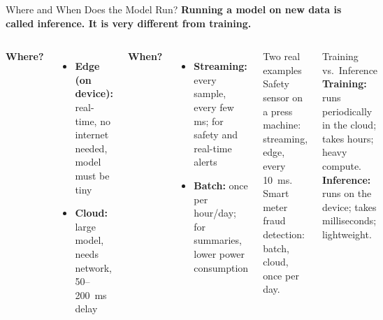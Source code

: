 \documentclass[aspectratio=169,11pt]{beamer}
\begin{document}
\begin{frame}{Where and When Does the Model Run?}
    \small
    \textbf{Running a model on new data is called \textbf{inference}. It is very different from training.}

    \vspace{0.25cm}
    \begin{columns}
        \textbf{Where?}
        \begin{itemize}\setlength{\itemsep}{8pt}
            \item \textbf{Edge (on device):} real-time, no internet needed, model must be tiny
            \item \textbf{Cloud:} large model, needs network, 50--200~ms delay
        \end{itemize}

        \vspace{0.3cm}
        \textbf{When?}
        \begin{itemize}\setlength{\itemsep}{8pt}
            \item \textbf{Streaming:} every sample, every few ms; for safety and real-time alerts
            \item \textbf{Batch:} once per hour/day; for summaries, lower power consumption
        \end{itemize}

        \begin{exampleblock}{Two real examples}
            Safety sensor on a press machine: streaming, edge, every 10~ms.\\[6pt]
            Smart meter fraud detection: batch, cloud, once per day.
        \end{exampleblock}

        \vspace{0.3cm}
        \begin{exampleblock}{Training vs.~Inference}
            \textbf{Training:} runs periodically in the cloud; takes hours; heavy compute.\\[4pt]
            \textbf{Inference:} runs on the device; takes milliseconds; lightweight.
        \end{exampleblock}
    \end{columns}
\end{frame}
\end{document}

